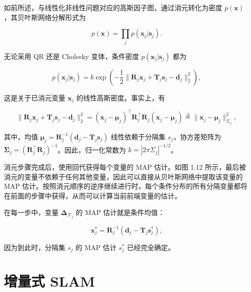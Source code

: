 如前所述，与线性化非线性问题对应的高斯因子图，通过消元转化为密度 $p(\pmb x)$，其贝叶斯网络分解形式为

\begin{equation}
p (\boldsymbol {x}) = \prod_ {j} p (\boldsymbol {x} _ {j} | \boldsymbol {s} _ {j}).\tag{1.50}
\end{equation}

无论采用 QR 还是 Cholesky 变体，条件密度 $p(\pmb x_j|\pmb s_j)$ 都为

\begin{equation}
p (\boldsymbol {x} _ {j} | \boldsymbol {s} _ {j}) = k \exp \left(- \frac {1}{2} \| \boldsymbol {R} _ {j} \boldsymbol {x} _ {j} + \boldsymbol {T} _ {j} \boldsymbol {s} _ {j} - \boldsymbol {d} _ {j} \| _ {2} ^ {2}\right),\tag{1.51}
\end{equation}

这是关于已消元变量 $\pmb x_j$ 的线性高斯密度。事实上，有

\begin{equation}
\| \boldsymbol {R} _ {j} \boldsymbol {x} _ {j} + \boldsymbol {T} _ {j} \boldsymbol {s} _ {j} - \boldsymbol {d} _ {j} \| _ {2} ^ {2} = (\boldsymbol {x} _ {j} - \boldsymbol {\mu} _ {j}) ^ {\top} \boldsymbol {R} _ {j} ^ {\top} \boldsymbol {R} _ {j} (\boldsymbol {x} _ {j} - \boldsymbol {\mu} _ {j}) \stackrel {{\Delta}} {{=}} \| \boldsymbol {x} _ {j} - \boldsymbol {\mu} _ {j} \| _ {\Sigma_ {j}} ^ {2},\tag{1.52}
\end{equation}

其中，均值 $\pmb\mu_j=\pmb R_j^{-1}(\pmb d_j-\pmb T_j\pmb s_j)$ 线性依赖于分隔集 $s_j$，协方差矩阵为 $\pmb\Sigma_j=(\pmb R_j^\top\pmb R_j)^{-1}$。因此，归一化常数为 $k=|2\pi\Sigma_j|^{-1/2}$。

消元步骤完成后，使用回代获得每个变量的 MAP 估计。如图 1.12 所示，最后被消元的变量不依赖于任何其他变量，因此可以直接从贝叶斯网络中提取该变量的 MAP 估计。按照消元顺序的逆序继续进行时，每个条件分布的所有分隔变量都将在前面的步骤中获得，从而可以计算当前前端变量的估计。

在每一步中，变量 $\boldsymbol\Delta_{\boldsymbol{\mathcal{X}}_j}$ 的 MAP 估计就是条件均值：

\begin{equation}
\pmb {x} _ {j} ^ {*} = \pmb {R} _ {j} ^ {- 1} (\pmb {d} _ {j} - \pmb {T} _ {j} \pmb {s} _ {j} ^ {*}),\tag{1.53}
\end{equation}

因为到此时，分隔集 $s_j$ 的 MAP 估计 $s_j^*$ 已经完全确定。

\section{增量式 SLAM}

